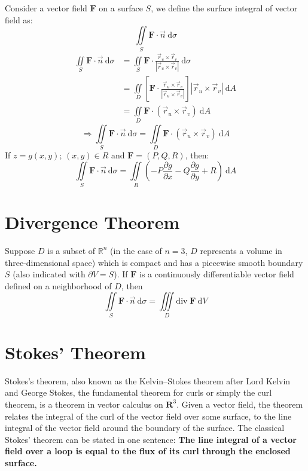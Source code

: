 \documentclass[12pt, fleqn]{book}
\newcommand{\D}{\mathrm{d}}
\newcommand{\iis}{\iint\limits_S}
\newcommand{\rutrv}{\vec{r}_u \times \vec{r}_v\right}
\newcommand{\F}{\mathbf{F}}
\newcommand{\R}{\mathbf{R}}
\newcommand{\Div}{\mathrm{div}}
\newcommand{\xy}{(x, y)}
\newcommand{\rond}[2]{\frac{\partial #1}{\partial #2}}
\begin{document}
     		Consider a vector field $\F$ on a surface $S$, we define the surface integral of vector field as:
     		\begin{equation}
     			\iis \F \cdot \vec{n} \ \D \sigma
     		\end{equation}
     		\begin{equation*}
     			\begin{split}
     				\iis \F \cdot \vec{n} \ \D \sigma
     				&  = \iis \F \cdot \frac{\vec{r}_u \times \vec{r}_v}{\left|\rutrv|} \ \D \sigma \\
     				& = \iint\limits_D \left[\F \cdot \frac{\vec{r}_u \times \vec{r}_v}{\left|\rutrv|}\right] \left|\rutrv| \ \D A \\
     				& = \iint\limits_D \F \cdot \left(\rutrv) \ \D A
     			\end{split}
     		\end{equation*}
     	    \begin{equation}
     	    	\Rightarrow 
     	    	\iis \F \cdot \vec{n} \ \D \sigma = \iint\limits_D \F \cdot \left(\rutrv) \ \D A
     	    \end{equation}
     		If $z = g\xy; \, \xy \in R$ and $\F = (P, Q, R)$, then:
     		\begin{equation}
     			\iis \F \cdot \vec{n} \ \D \sigma = 
     			\iint\limits_R \left(-P \rond{g}{x} - Q\rond{g}{y} + R\right) \ \D A
     		\end{equation}
     	
     	\section{Divergence Theorem}
	     	Suppose $D$ is a subset of $\mathbb{R}^{n}$ (in the case of $n = 3$, $D$ represents a volume in three-dimensional space) which is compact and has a piecewise smooth boundary $S$ (also indicated with $\partial V = S$). If $\F$ is a continuously differentiable vector field defined on a neighborhood of $D$, then
     		\begin{equation}
     			 \iis \F \cdot \vec{n} \ \D \sigma = \iiint\limits_D \Div \; \F \ \D V
     		\end{equation}
     	\section{Stokes' Theorem}
     		Stokes's theorem, also known as the Kelvin–Stokes theorem after Lord Kelvin and George Stokes, the fundamental theorem for curls or simply the curl theorem, is a theorem in vector calculus on $\R^3$. Given a vector field, the theorem relates the integral of the curl of the vector field over some surface, to the line integral of the vector field around the boundary of the surface. The classical Stokes' theorem can be stated in one sentence: \textbf{The line integral of a vector field over a loop is equal to the flux of its curl through the enclosed surface.}
     		
\end{document}
